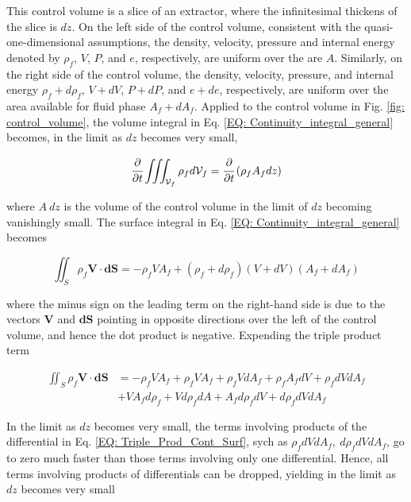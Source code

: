 \documentclass[../Parameter_fitting.tex]{subfiles}
\begin{document}
	This control volume is a slice of an extractor, where the infinitesimal thickens of the slice is $dz$. On the left side of the control volume, consistent with the quasi-one-dimensional assumptions, the density, velocity, pressure and internal energy denoted by $\rho_f$, $V$, $P$, and $e$, respectively, are uniform over the are $A$. Similarly, on the right side of the control volume, the density, velocity, pressure, and internal energy $\rho_f+d\rho_f$, $V+dV$, $P+dP$, and $e+de$, respectively, are uniform over the area available for fluid phase $A_f+dA_f$. Applied to the control volume in Fig. \ref{fig: control_volume}, the volume integral in Eq. \ref{EQ: Continuity_integral_general} becomes, in the limit as $dz$ becomes very small,
	
	{\footnotesize
		\begin{equation}
			\cfrac{\partial}{\partial t} \iiint_{\mathcal{V}_f} \rho_f d\mathcal{V}_f = \cfrac{\partial}{\partial t}\left( \rho_f A_f dz \right)
			\label{EQ: Cont_Simpl_Vol}
		\end{equation}
	}

	where $A~dz$ is the volume of the control volume in the limit of $dz$ becoming vanishingly small. The surface integral in Eq. \ref{EQ: Continuity_integral_general} becomes
	
	{\footnotesize
		\begin{equation}
			\iint_S \rho_f \textbf{V} \cdot \textbf{dS} = -\rho_f V A_f + (\rho_f+d\rho_f)(V+dV)(A_f+dA_f)
		\end{equation}
	}

	where the minus sign on the leading term on the right-hand side is due to the vectors $\textbf{V}$ and $\textbf{dS}$ pointing in opposite directions over the left of the control volume, and hence the dot product is negative. Expending the triple product term 
	 
	{\footnotesize
		\begin{align}
			\iint_S \rho_f \textbf{V} \cdot \textbf{dS} &= -\rho_f V A_f + \rho_f V A_f + \rho_f V dA_f + \rho_f A_f dV + \rho_f dV dA_f \nonumber \\ 
			&+ V A_f d\rho_f + V d\rho_f dA + A_f d\rho_f dV + d\rho_f dV dA_f
			\label{EQ: Triple_Prod_Cont_Surf}
		\end{align}
	}
	
	In the limit as $dz$ becomes very small, the terms involving products of the differential in Eq. \ref{EQ: Triple_Prod_Cont_Surf}, sych as $\rho_f dV dA_f,~d\rho_f dV dA_f$, go to zero much faster than those terms involving only one differential. Hence, all terms involving products of differentials can be dropped, yielding in the limit as $dz$ becomes very small
	
\end{document}
